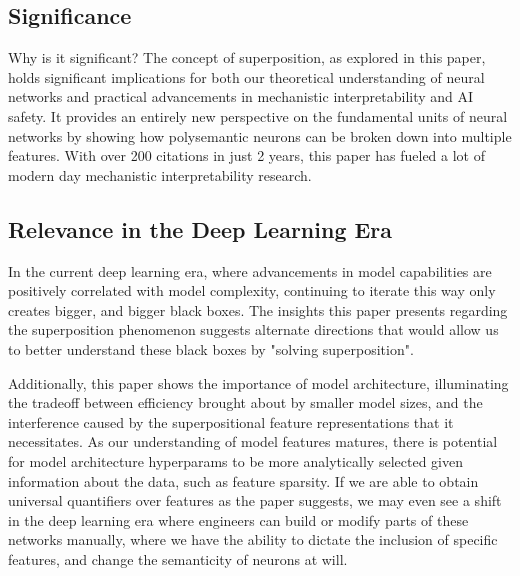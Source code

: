 
\subsection{Significance}

Why is it significant?
The concept of superposition, as explored in this paper, holds significant implications for both our theoretical understanding of neural networks and practical advancements in mechanistic interpretability and AI safety.
It provides an entirely new perspective on the fundamental units of neural networks by showing how polysemantic neurons can be broken down into multiple features.
With over 200 citations in just 2 years, this paper has fueled a lot of modern day mechanistic interpretability research.

%
%

\subsection{Relevance in the Deep Learning Era}

In the current deep learning era, where advancements in model capabilities are positively correlated with model complexity, continuing to iterate this way only creates bigger, and bigger black boxes.
The insights this paper presents regarding the superposition phenomenon suggests alternate directions that would allow us to better understand these black boxes by "solving superposition".

Additionally, this paper shows the importance of model architecture, illuminating the tradeoff between efficiency brought about by smaller model sizes, and the interference caused by the superpositional feature representations that it necessitates.
As our understanding of model features matures, there is potential for model architecture hyperparams to be more analytically selected given information about the data, such as feature sparsity.
If we are able to obtain universal quantifiers over features as the paper suggests, we may even see a shift in the deep learning era where engineers can build or modify parts of these networks manually, where we have the ability to dictate the inclusion of specific features, and change the semanticity of neurons at will.

